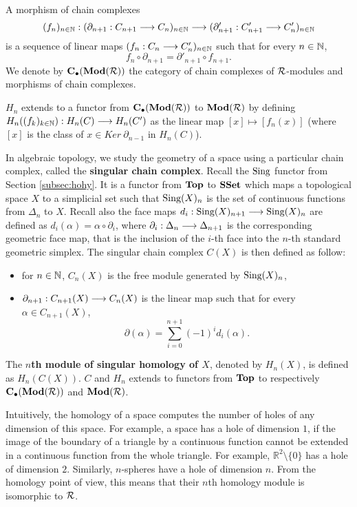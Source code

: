 A morphism of chain complexes
$$(f_n)_{n\in\mathbb{N}} : (\partial_{n+1} : C_{n+1} \longrightarrow C_n)_{n\in\mathbb{N}} \longrightarrow (\partial'_{n+1} : C'_{n+1} \longrightarrow C'_n)_{n\in\mathbb{N}}$$
is a sequence of linear maps $(f_n : C_n \longrightarrow C'_n)_{n\in\mathbb{N}}$ such that for every $n \in \mathbb{N}$, 
$$f_n \circ \partial_{n+1} = \partial'_{n+1} \circ f_{n+1}.$$
We denote by $\textbf{C}_\bullet(\textbf{Mod}(\mathcal{R}))$ the category of chain complexes of $\mathcal{R}$-modules and morphisms of chain complexes.

$H_n$ extends to a functor from $\textbf{C}_\bullet(\textbf{Mod}(\mathcal{R}))$ to $\textbf{Mod}(\mathcal{R})$ by defining $H_n((f_k)_{k\in\mathbb{N}}) : H_n(C) \longrightarrow H_n(C')$ as the linear map $[x] \mapsto [f_n(x)]$ (where $[x]$ is the class of $x\in Ker ~ \partial_{n-1}$ in $H_n(C)$).
 
In algebraic topology, we study the geometry of a space using a particular chain complex, called the \textbf{singular chain complex}. Recall the $\text{Sing}$ functor from Section \ref{subsec:hohy}. It is a functor from $\textbf{Top}$ to $\textbf{SSet}$ which maps a topological space $X$ to a simplicial set such that $\text{Sing}(X)_n$ is the set of continuous functions from $\Delta_n$ to $X$. Recall also the face maps $d_i : \text{Sing}(X)_{n+1} \longrightarrow \text{Sing}(X)_n$ are defined as $d_i(\alpha) = \alpha\circ\partial_i$, where $\partial_i : \Delta_n \longrightarrow \Delta_{n+1}$ is the corresponding geometric face map, that is the inclusion of the $i$-th face into the $n$-th standard geometric simplex. The singular chain complex $C(X)$ is then defined as follow:
\begin{itemize}
	\item for $n\in\mathbb{N}$, $C_n(X)$ is the free module generated by $\text{Sing}(X)_n$,
	\item $\partial_{n+1} : C_{n+1}(X) \longrightarrow C_n(X)$ is the linear map such that for every $\alpha \in C_{n+1}(X)$, $$\partial(\alpha) = \sum\limits_{i=0}^{n+1} (-1)^i d_i(\alpha).$$
\end{itemize}
The \textbf{$n$th module of singular homology of $X$}, denoted by $H_n(X)$, is defined as $H_n(C(X))$. $C$ and $H_n$ extends to functors from $\textbf{Top}$ to respectively $\textbf{C}_\bullet(\textbf{Mod}(\mathcal{R}))$ and $\textbf{Mod}(\mathcal{R})$.

Intuitively, the homology of a space computes the number of holes of any dimension of this space. For example, a space has a hole of dimension $1$, if the image of the boundary of a triangle by a continuous function cannot be extended in a continuous function from the whole triangle. For example, $\mathbb{R}^2\setminus\{0\}$ has a hole of dimension $2$. Similarly, $n$-spheres have a hole of dimension $n$. From the homology point of view, this means that their $n$th homology module is isomorphic to $\mathcal{R}$.

